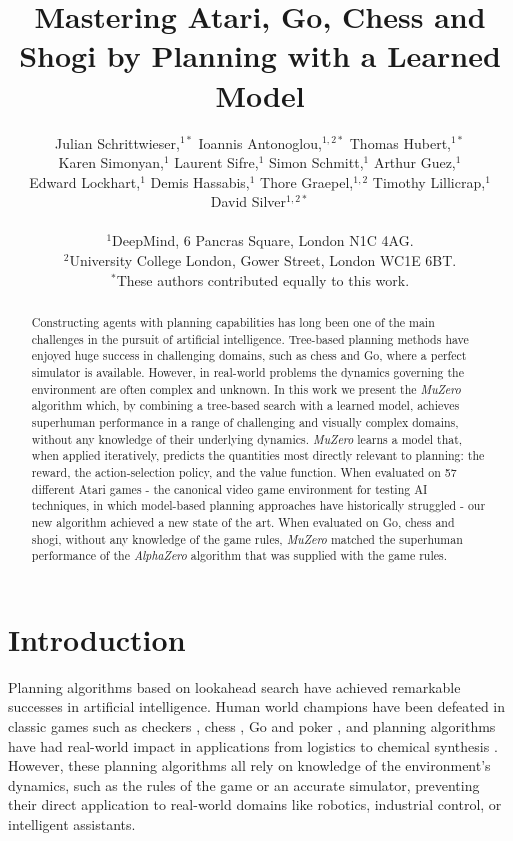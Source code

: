 \documentclass{article}
\title{Mastering Atari, Go, Chess and Shogi by Planning with a Learned Model}
\author{
Julian Schrittwieser,$^{1\ast}$ Ioannis Antonoglou,$^{1,2\ast}$ Thomas Hubert,$^{1\ast}$ \\
Karen Simonyan,$^{1}$ Laurent Sifre,$^{1}$ Simon Schmitt,$^{1}$ Arthur Guez,$^{1}$ \\
Edward Lockhart,$^{1}$ Demis Hassabis,$^{1}$ Thore Graepel,$^{1,2}$ Timothy Lillicrap,$^{1}$ \\
David Silver$^{1,2\ast}$
\\
\\
\normalsize{$^{1}$DeepMind, 6 Pancras Square, London N1C 4AG.}
\\
\normalsize{$^{2}$University College London, Gower Street, London WC1E 6BT.}
\\
\normalsize{$^\ast$These authors contributed equally to this work.}
}
\date{}
\newcommand{\muzero}{\emph{MuZero}}
\newcommand{\alphazero}{\emph{AlphaZero}}
\begin{document}
\maketitle

\begin{abstract}
\normalsize
Constructing agents with planning capabilities has long been one of the main challenges in the pursuit of artificial  intelligence. Tree-based planning methods have enjoyed huge success in challenging domains, such as chess and Go, where a perfect simulator is available. However, in real-world problems the dynamics governing the environment are often complex and unknown.
%
In this work we present the \muzero{} algorithm which, by combining a tree-based search with a learned model, achieves superhuman performance in a range of challenging and visually complex domains, without any knowledge of their underlying dynamics. \muzero{} learns a model that, when applied iteratively, predicts the quantities most directly relevant to planning: the reward, the action-selection policy, and the value function. When evaluated on 57 different Atari games - the canonical video game environment for testing AI techniques, in which model-based planning approaches have historically struggled - our new algorithm achieved a new state of the art. When evaluated on Go, chess and shogi, without any knowledge of the game rules, \muzero{} matched the superhuman performance of the \alphazero{} algorithm that was supplied with the game rules.
\end{abstract}

\section{Introduction}

Planning algorithms based on lookahead search have achieved remarkable successes in artificial intelligence. Human world champions have been defeated in classic games such as checkers \cite{schaeffer:chinook}, chess \cite{campbell:deep-blue}, Go \cite{Silver16AG} and poker \cite{brown2018superhuman, deepstack}, and planning algorithms have had real-world impact in applications from logistics \cite{vlahavas2013planning} to chemical synthesis \cite{alphachem}.
However, these planning algorithms all rely on knowledge of the environment's dynamics, such as the rules of the game or an accurate simulator, preventing their direct application to real-world domains like robotics, industrial control, or intelligent assistants.
%
\end{document}
